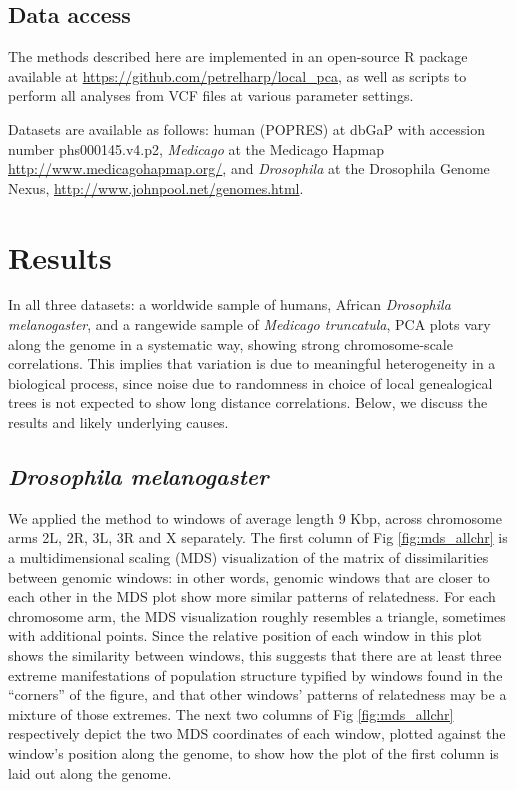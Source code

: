 \documentclass[11pt, oneside]{article}   	%
\newcommand{\Figure}{Fig }
\newcommand{\Figure}{{Figure }}
\begin{document}
\subsection{Data access}

The methods described here
are implemented in an open-source R package
available at \url{https://github.com/petrelharp/local_pca},
as well as scripts to perform all analyses from VCF files
at various parameter settings.

Datasets are available as follows:
human (POPRES) at dbGaP with accession number phs000145.v4.p2,
\textit{Medicago} at the Medicago Hapmap \url{http://www.medicagohapmap.org/},
and \textit{Drosophila} at the Drosophila Genome Nexus, \url{http://www.johnpool.net/genomes.html}.


\section{Results}

In all three datasets:
a worldwide sample of humans, African \textit{Drosophila melanogaster},
and a rangewide sample of \textit{Medicago truncatula},
PCA plots vary along the genome in a systematic way, showing strong chromosome-scale correlations.
This implies that variation is due to meaningful heterogeneity in a biological process,
since noise due to randomness in choice of local genealogical trees
is not expected to show long distance correlations. 
Below, we discuss the results and likely underlying causes.


\subsection{\textit{Drosophila melanogaster}}

We applied the method to windows of average length 9 Kbp, across chromosome arms 2L, 2R, 3L, 3R and X separately.
The first column of \Figure \ref{fig:mds_allchr} is a multidimensional scaling (MDS) visualization 
of the matrix of dissimilarities between genomic windows:
in other words, genomic windows that are closer to each other in the MDS plot show more similar patterns of relatedness.
For each chromosome arm, the MDS visualization roughly resembles a triangle,
sometimes with additional points.
Since the relative position of each window in this plot shows the similarity between windows, 
this suggests that there are at least three extreme manifestations of population structure 
typified by windows found in the ``corners'' of the figure,
and that other windows' patterns of relatedness may be a mixture of those extremes. 
The next two columns of \Figure \ref{fig:mds_allchr} respectively depict the two MDS coordinates of each window,
plotted against the window's position along the genome,
to show how the plot of the first column is laid out along the genome.
\end{document}

